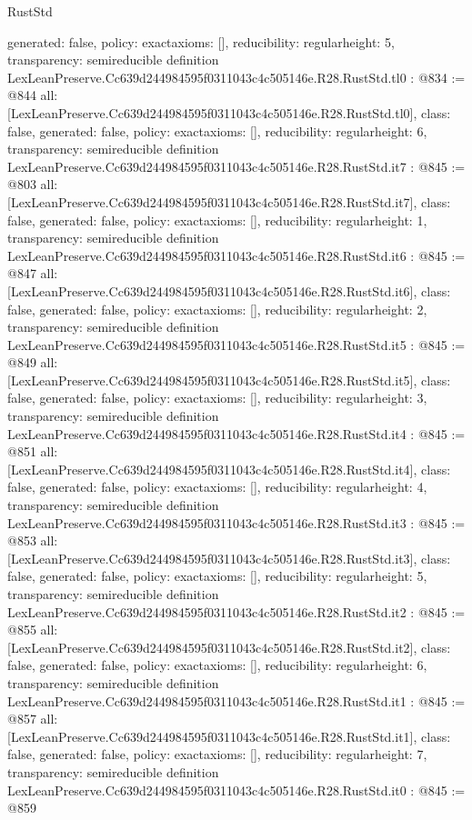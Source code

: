 \begin{lexlean}{RustStd}
\begin{coremodule}
{  generated: false,
  policy: exact{axioms: []},
  reducibility: regular{height: 5},
  transparency: semireducible
}
definition LexLeanPreserve.Cc639d244984595f0311043c4c505146e.R28.RustStd.tl0 : @834 := @844 {
  all: [LexLeanPreserve.Cc639d244984595f0311043c4c505146e.R28.RustStd.tl0],
  class: false,
  generated: false,
  policy: exact{axioms: []},
  reducibility: regular{height: 6},
  transparency: semireducible
}
definition LexLeanPreserve.Cc639d244984595f0311043c4c505146e.R28.RustStd.it7 : @845 := @803 {
  all: [LexLeanPreserve.Cc639d244984595f0311043c4c505146e.R28.RustStd.it7],
  class: false,
  generated: false,
  policy: exact{axioms: []},
  reducibility: regular{height: 1},
  transparency: semireducible
}
definition LexLeanPreserve.Cc639d244984595f0311043c4c505146e.R28.RustStd.it6 : @845 := @847 {
  all: [LexLeanPreserve.Cc639d244984595f0311043c4c505146e.R28.RustStd.it6],
  class: false,
  generated: false,
  policy: exact{axioms: []},
  reducibility: regular{height: 2},
  transparency: semireducible
}
definition LexLeanPreserve.Cc639d244984595f0311043c4c505146e.R28.RustStd.it5 : @845 := @849 {
  all: [LexLeanPreserve.Cc639d244984595f0311043c4c505146e.R28.RustStd.it5],
  class: false,
  generated: false,
  policy: exact{axioms: []},
  reducibility: regular{height: 3},
  transparency: semireducible
}
definition LexLeanPreserve.Cc639d244984595f0311043c4c505146e.R28.RustStd.it4 : @845 := @851 {
  all: [LexLeanPreserve.Cc639d244984595f0311043c4c505146e.R28.RustStd.it4],
  class: false,
  generated: false,
  policy: exact{axioms: []},
  reducibility: regular{height: 4},
  transparency: semireducible
}
definition LexLeanPreserve.Cc639d244984595f0311043c4c505146e.R28.RustStd.it3 : @845 := @853 {
  all: [LexLeanPreserve.Cc639d244984595f0311043c4c505146e.R28.RustStd.it3],
  class: false,
  generated: false,
  policy: exact{axioms: []},
  reducibility: regular{height: 5},
  transparency: semireducible
}
definition LexLeanPreserve.Cc639d244984595f0311043c4c505146e.R28.RustStd.it2 : @845 := @855 {
  all: [LexLeanPreserve.Cc639d244984595f0311043c4c505146e.R28.RustStd.it2],
  class: false,
  generated: false,
  policy: exact{axioms: []},
  reducibility: regular{height: 6},
  transparency: semireducible
}
definition LexLeanPreserve.Cc639d244984595f0311043c4c505146e.R28.RustStd.it1 : @845 := @857 {
  all: [LexLeanPreserve.Cc639d244984595f0311043c4c505146e.R28.RustStd.it1],
  class: false,
  generated: false,
  policy: exact{axioms: []},
  reducibility: regular{height: 7},
  transparency: semireducible
}
definition LexLeanPreserve.Cc639d244984595f0311043c4c505146e.R28.RustStd.it0 : @845 := @859 {
}
\end{coremodule}
\end{lexlean}
